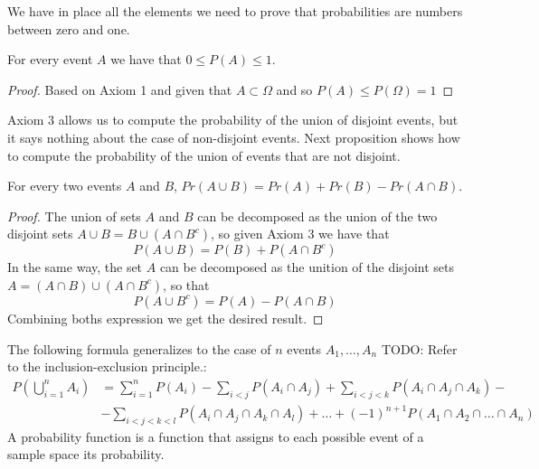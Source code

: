 We have in place all the elements we need to prove that probabilities are numbers between zero and one.

\begin{proposition}
For every event $A$ we have that $0 \leq P \left( A \right) \leq 1$.
\end{proposition}
\begin{proof}
Based on Axiom 1 and given that $A \subset \Omega$ and so $P \left( A \right) \leq P \left( \Omega \right) = 1$
\end{proof}

Axiom 3 allows us to compute the probability of the union of disjoint events, but it says nothing about the case of non-disjoint events. Next proposition shows how to compute the probability of the union of events that are not disjoint.

\begin{proposition}
For every two events $A$ and $B$, $Pr\left(A\cup B\right)=Pr\left(A\right)+Pr\left(B\right)-Pr\left(A\cap B\right)$.
\end{proposition}
\begin{proof}
The union of sets $A$ and $B$ can be decomposed as the union of the two disjoint sets $A \cup B = B \cup \left( A \cap B^c \right)$, so given Axiom 3 we have that
\[
P \left( A \cup B \right) = P \left( B \right) + P \left( A \cap B^c \right)
\]
In the same way, the set $A$ can be decomposed as the unition of the disjoint sets $A = \left( A \cap B \right) \cup \left( A \cap B^c \right)$, so that
\[
P \left( A \cup B^c \right) = P \left( A \right) - P \left( A \cap B \right)
\]
Combining boths expression we get the desired result.
\end{proof}

The following formula generalizes to the case of $n$ events $A_1, \ldots, A_n$ {\color{red} TODO: Refer to the inclusion-exclusion principle.}:
\begin{equation*}
\begin{split}
P \left( \bigcup_{i=1}^n A_i \right) & = \sum_{i=1}^n P \left( A_i \right) - \sum_{i<j} P \left( A_i \cap A_j \right) + \sum_{i<j<k} P \left( A_i \cap A_j \cap A_k \right) - \\
&  - \sum_{i<j<k<l} P \left( A_i \cap A_j \cap A_k \cap A_l \right) + \ldots +  (-1)^{n+1} P \left( A_1 \cap A_2 \cap \ldots \cap A_n \right) 
\end{split}
\end{equation*}
A probability function is a function that assigns to each possible event of a sample space its probability.

